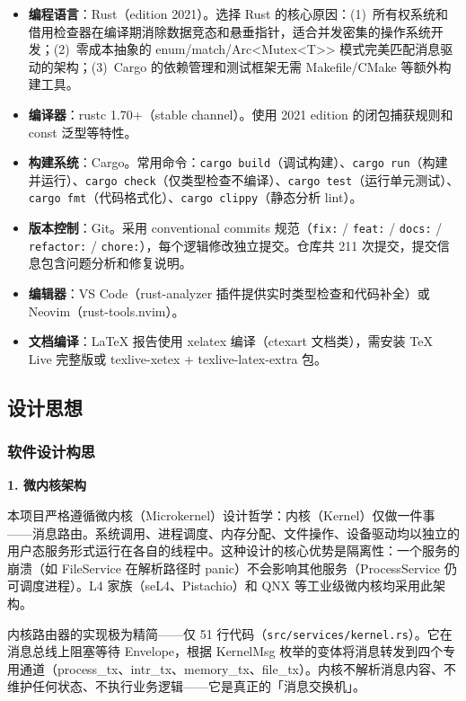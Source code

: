 \documentclass[UTF8,a4paper,12pt]{ctexart}
\begin{document}
\begin{itemize}
    \item \textbf{编程语言}：Rust（edition 2021）。选择 Rust 的核心原因：(1)~所有权系统和借用检查器在编译期消除数据竞态和悬垂指针，适合并发密集的操作系统开发；(2)~零成本抽象的 enum/match/Arc<Mutex<T>> 模式完美匹配消息驱动的架构；(3)~Cargo 的依赖管理和测试框架无需 Makefile/CMake 等额外构建工具。
    \item \textbf{编译器}：rustc 1.70+（stable channel）。使用 2021 edition 的闭包捕获规则和 const 泛型等特性。
    \item \textbf{构建系统}：Cargo。常用命令：\texttt{cargo build}（调试构建）、\texttt{cargo run}（构建并运行）、\texttt{cargo check}（仅类型检查不编译）、\texttt{cargo test}（运行单元测试）、\texttt{cargo fmt}（代码格式化）、\texttt{cargo clippy}（静态分析 lint）。
    \item \textbf{版本控制}：Git。采用 conventional commits 规范（\texttt{fix:} / \texttt{feat:} / \texttt{docs:} / \texttt{refactor:} / \texttt{chore:}），每个逻辑修改独立提交。仓库共 211 次提交，提交信息包含问题分析和修复说明。
    \item \textbf{编辑器}：VS Code（rust-analyzer 插件提供实时类型检查和代码补全）或 Neovim（rust-tools.nvim）。
    \item \textbf{文档编译}：LaTeX 报告使用 xelatex 编译（ctexart 文档类），需安装 TeX Live 完整版或 texlive-xetex + texlive-latex-extra 包。
\end{itemize}

\subsection{设计思想}

\subsubsection{软件设计构思}

\textbf{1. 微内核架构}

本项目严格遵循微内核（Microkernel）设计哲学：内核（Kernel）仅做一件事——消息路由。系统调用、进程调度、内存分配、文件操作、设备驱动均以独立的用户态服务形式运行在各自的线程中。这种设计的核心优势是隔离性：一个服务的崩溃（如 FileService 在解析路径时 panic）不会影响其他服务（ProcessService 仍可调度进程）。L4 家族（seL4、Pistachio）和 QNX 等工业级微内核均采用此架构。

内核路由器的实现极为精简——仅 51 行代码（\texttt{src/services/kernel.rs}）。它在消息总线上阻塞等待 Envelope，根据 KernelMsg 枚举的变体将消息转发到四个专用通道（process\_tx、intr\_tx、memory\_tx、file\_tx）。内核不解析消息内容、不维护任何状态、不执行业务逻辑——它是真正的「消息交换机」。
\end{document}

